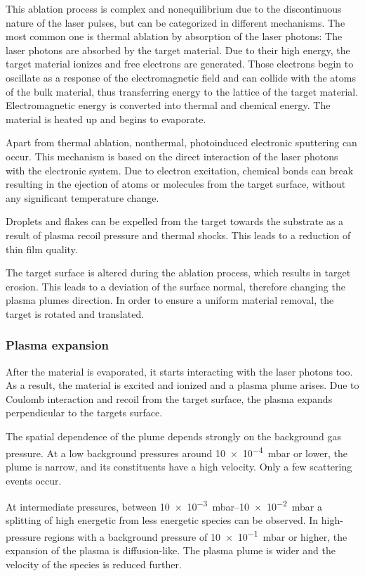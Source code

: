 This ablation process is complex and nonequilibrium due to the discontinuous nature 
of the laser pulses, but can be categorized in different mechanisms. 
The most common one is thermal ablation by absorption of the laser photons:
The laser photons are absorbed by the target material.
Due to their high energy, the target material ionizes and 
free electrons are generated.
Those electrons begin to oscillate as a response of the electromagnetic field 
and can collide with the atoms of the bulk material,
thus transferring energy to the lattice of the target material.
Electromagnetic energy is converted into thermal and chemical energy.
The material is heated up and begins to evaporate.

Apart from thermal ablation, nonthermal, photoinduced electronic sputtering can occur.
This mechanism is based on the direct interaction of the laser photons with the 
electronic system.
Due to electron excitation, chemical bonds can break resulting in the ejection of
atoms or molecules from the target surface, without any significant temperature change. 

Droplets and flakes can be expelled from the target towards the substrate as a result
of plasma recoil pressure and thermal shocks. 
This leads to a reduction of thin film quality.

The target surface is altered during the ablation process, which results in target 
erosion.
This leads to a deviation of the surface normal, therefore changing the plasma 
plumes direction.
In order to ensure a uniform material removal, the target is rotated and translated.

\subsubsection{Plasma expansion}
After the material is evaporated, it starts interacting with the laser photons too.
As a result, the material is excited and ionized and a plasma plume arises.
Due to Coulomb interaction and recoil from the target surface, 
the plasma expands perpendicular to the targets surface.

The spatial dependence of the plume depends strongly on the background gas pressure.
At a low background pressures around \qty{10e-4}{\milli \bar} or lower, the plume is
narrow, and its constituents have a high velocity.
Only a few scattering events occur.

At intermediate pressures, between \qtyrange{10e-3}{10e-2}{\milli \bar}
a splitting of high energetic from less energetic species can be observed.
In high-pressure regions with a background pressure of \qty{10e-1}{\milli \bar} or 
higher, the expansion of the plasma is diffusion-like.
The plasma plume is wider and the velocity of the species is
reduced further.


